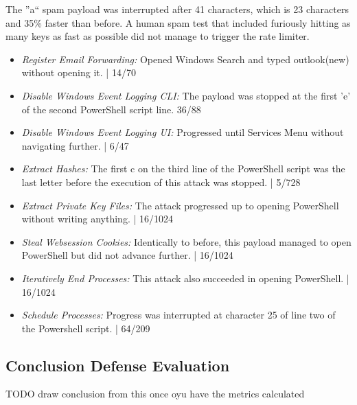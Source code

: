 The ''a`` spam payload was interrupted after 41 characters, which is 23 characters and 35\% faster than before. A human spam test that included furiously hitting as many keys as fast as possible did not manage to trigger the rate limiter.

 \begin{itemize}
    \item  \emph{Register Email Forwarding:} Opened Windows Search and typed outlook(new) without opening it. | 14/70
    \item  \emph{Disable Windows Event Logging CLI:} The payload was stopped at the first 'e' of the second PowerShell script line. 36/88
    \item  \emph{Disable Windows Event Logging UI:} Progressed until Services Menu without navigating further. | 6/47
    \item  \emph{Extract Hashes:} The first c on the third line of the PowerShell script was the last letter before the execution of this attack was stopped. | 5/728
    \item  \emph{Extract Private Key Files:}  The attack progressed up to opening PowerShell without writing anything. | 16/1024
    \item  \emph{Steal Websession Cookies:} Identically to before, this payload managed to open PowerShell but did not advance further. | 16/1024
    \item  \emph{Iteratively End Processes:} This attack also succeeded in opening PowerShell. | 16/1024
    \item  \emph{Schedule Processes:} Progress was interrupted at character 25 of line two of the Powershell script. | 64/209
\end{itemize}


\subsection{Conclusion Defense Evaluation}

TODO draw conclusion from this once oyu have the metrics calculated


